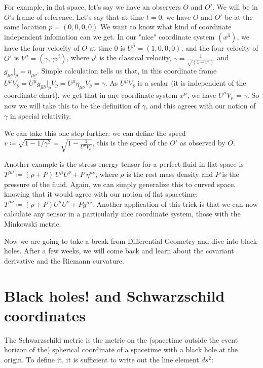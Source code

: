 \documentclass[10pt]{article}
\newcommand{\xm}{x^\mu}
\newcommand{\gmn}{g_{\mu \nu}}
\newcommand{\gmnhat}{g_{\hat{\mu} \hat{\nu}}}
\newcommand{\emn}{\eta_{\mu \nu}}
\begin{document}
For example, in flat space, let's say we have an observers $O$ and $O'$. We will be in $O$'s frame of reference. Let's say that at time $t = 0$, we have $O$ and $O'$ be at the same location $p = (0,0,0,0)$ We want to know what kind of coordinate independent infomation can we get. In our "nice" coordinate system $(x^{\hat{\mu}})$, we have the four velocity of $O$ at time 0 is $U^{\hat{\mu}} = (1,0,0,0)$, and the four velocity of $O'$ is $V^{\hat{\mu}} = (\gamma, \gamma v^i)$, where $v^i$ is the classical velocity, $\gamma = \frac{1}{\sqrt{(1-v^2)}}$ and $\gmn|_p = \emn$. Simple calculation tells us that, in this coordinate frame $U^{\hat{\mu}} V_{\hat{\nu}} =U^{\hat{\mu}} \gmnhat|_p V_{\hat{\nu}}  = U^{\hat{\mu}} \emn V_{\hat{\nu}} = \gamma$. As $U^{\hat{\mu}} V_{\hat{\nu}}$ is a scalar (it is independent of the coordinate chart), we get that in any coordinate system $\xm$, we have $U^{\mu} V_{\mu} = \gamma$. So now we will take this to be the definition of $\gamma$, and this agrees with our notion of $\gamma$ in special relativity.

We can take this one step further: we can define the speed $v \coloneqq \sqrt{1- 1/{\gamma^2}} = \sqrt{1- \frac {1}{U^{\mu}{V_{\mu}}}}$, this is the speed of the $O'$ as observed by $O$.

Another example is the stress-energy tensor for a perfect fluid in flat space  is $T^{\hat{\mu}{\hat{\nu}}} 
\coloneqq (\rho + P) \ U^{\hat{\mu}}U^{\hat{\nu}} + P \ \eta^{\hat{\mu} \hat{\nu}}$, where $\rho$ is the rest mass density and $P$ is the pressure of the fluid. Again, we can simply generalize this to curved space, knowing that it would agree with our notion of flat spacetime: $T^{\mu \nu} \coloneqq (\rho + P) U^{\mu}U^{\nu} + P g^{\mu \nu}.$ Another application of this trick is that we can now calculate any tensor in a particularly nice coordinate system, those with the Minkowski metric.

Now we are going to take a break from Differential Geometry and dive into black holes. After a few weeks, we will come back and learn about the covariant derivative and the Riemann curvature.



\section{Black holes! and Schwarzschild coordinates}\label{sec:class_style}

The Schwarzschild metric is the metric on the (spacetime outside the event horizon of the) spherical coordinate of a spacetime with a black hole at the origin. To define it, it is sufficient to write out the line element $ds^2$:
\end{document}
